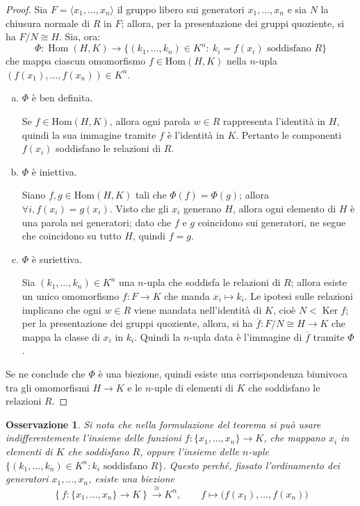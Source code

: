 \documentclass[12pt]{scrartcl}
\theoremstyle{style}
\newtheorem{osservazione}{Osservazione}[section]
\numberwithin{equation}{subsection}
\begin{document}
	\begin{proof}
Sia \(F=\langle x_1,\dots,x_n\rangle\) il gruppo libero sui generatori \(x_1,\dots,x_n\) e sia \(N\) la chiusura normale di \(R\) in \(F\); allora, per la presentazione dei gruppi quoziente, si ha $F / N \cong H$. 
Sia, ora:
\[
\Phi:\operatorname{Hom}(H,K)\longrightarrow \{(k_1,\dots,k_n)\in K^n:\ k_i=f(x_i)\text{ soddisfano }R\}
\]
che mappa ciascun omomorfismo $f \in \mathrm{Hom} (H,K)$ nella $n$-upla \((f(x_1),\dots,f(x_n)) \in K^n\).

\begin{enumerate}[(a).]
	\item $\Phi$ \`e ben definita.

Se $f \in \mathrm{Hom} (H,K)$, allora ogni parola \(w\in R\) rappresenta l'identità in \(H\), quindi la sua immagine tramite \(f\) è l'identità in \(K\). 
Pertanto le componenti \(f(x_i)\) soddisfano le relazioni di \(R\).

\item $\Phi$ \`e iniettiva.

Siano \(f,g \in \mathrm{Hom} (H,K)\) tali che \(\Phi(f)=\Phi(g)\); allora \(\forall i, f(x_i)=g(x_i)\).
Visto che gli \(x_i\) generano \(H\), allora ogni elemento di \(H\) è una parola nei generatori; dato che \(f\) e \(g\) coincidono sui generatori, ne segue che coincidono su tutto \(H\), quindi \(f=g\).

\item $\Phi$ \`e suriettiva.

Sia \((k_1,\dots,k_n)\in K^n\) una \(n\)-upla che soddisfa le relazioni di \(R\); allora esiste un unico omomorfismo $f : F \to K$ che manda \(x_i\longmapsto k_i\).
Le ipotesi sulle relazioni implicano che ogni \(w\in R\) viene mandata nell'identità di \(K\), cioè $N < \operatorname{Ker} f$; per la presentazione dei gruppi quoziente, allora, si ha $\overline{f}:F / N \cong H \longrightarrow K$ che mappa la classe di $x_i$ in $k_i$.
Quindi la $n$-upla data è l'immagine di $\overline{f}$ tramite \(\Phi\).
\end{enumerate}
Se ne conclude che \(\Phi\) è una biezione, quindi esiste una corrispondenza biunivoca tra gli omomorfismi \(H\to K\) e le \(n\)-uple di elementi di \(K\) che soddisfano le relazioni \(R\). 
\end{proof}
\begin{osservazione}
Si nota che nella formulazione del teorema si può usare indifferentemente l'insieme delle funzioni \(f:\{x_1,\dots,x_n\}\longrightarrow K\), che mappano \(x_i\) in elementi di \(K\) che soddisfano \(R\), oppure l'insieme delle \(n\)-uple \(\{(k_1,\dots,k_n)\in K^n:k_i \text{ soddisfano } R\}\).
Questo perché, fissato l'ordinamento dei generatori \(x_1,\dots,x_n\), esiste una biezione 
\[
\left\{ f:\{x_1,\dots,x_n\}\longrightarrow  K\right\}\xrightarrow{\ \cong\ }K^n,\qquad f\longmapsto\big(f(x_1),\dots,f(x_n)\big)
\]
\end{osservazione}
\end{document}
